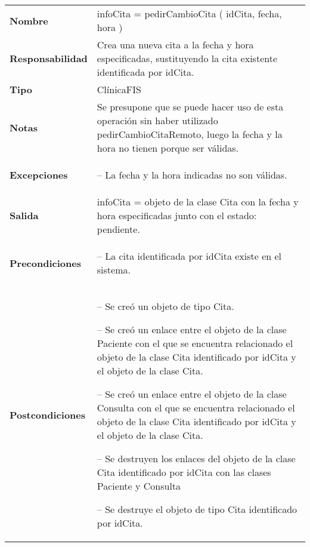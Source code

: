  \begin{table}[H]
  \centering
  \begin{tabularx}{\textwidth}{l|X}
    \textbf{Nombre}        &  infoCita = pedirCambioCita ( idCita, fecha, hora ) \\ 
    \textbf{Responsabilidad}  &  Crea una nueva cita a la fecha y hora
    especificadas, sustituyendo la cita existente identificada por idCita. \\ 
    \textbf{Tipo}        &  ClínicaFIS \\ 
    \textbf{Notas}        &  Se presupone que se puede hacer uso de esta
    operación sin haber utilizado pedirCambioCitaRemoto, luego la fecha y la
    hora no tienen porque ser válidas.\\
    \textbf{Excepciones}    &
    \begin{itemizenomargins}
    \item[--] La fecha y la hora indicadas no son válidas.
    \end{itemizenomargins} \\
    \textbf{Salida}        &  infoCita = objeto de la clase Cita con la fecha y
    hora especificadas junto con el estado: pendiente.\\ 
    \textbf{Precondiciones}    &
    \begin{itemizenomargins}
    \item[--] La cita identificada por idCita existe en el sistema.
    \end{itemizenomargins} \\ 
    \textbf{Postcondiciones}  &
    \begin{itemizenomargins}
    \item[--] Se creó un objeto de tipo Cita.
    \item[--] Se creó un enlace entre el objeto de la clase Paciente con el que
      se encuentra relacionado el objeto de la clase Cita identificado por idCita y el objeto de la clase Cita.
    \item[--] Se creó un enlace entre el objeto de la clase Consulta con el que
      se encuentra relacionado el objeto de la clase Cita identificado por idCita y el objeto de la clase Cita.
    \item[--] Se destruyen los enlaces del objeto de la clase Cita identificado
      por idCita con las clases Paciente y Consulta
    \item[--] Se destruye el objeto de tipo Cita identificado por idCita.
      
    \end{itemizenomargins}

  \end{tabularx}
\end{table}

